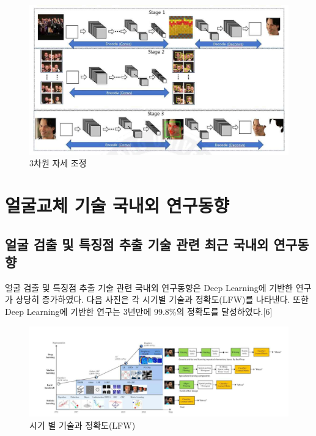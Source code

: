 \documentclass[chapter,oneside]{oblivoir}
\begin{document}
\begin{enumerate}
    \begin{figure}[h!]
        \centering
        \includegraphics{pic/chp1/img496}
        \caption{ 3차원 자세 조정\cite{reference4}}
    \end{figure}
\end{enumerate}

\section{얼굴교체 기술 국내외 연구동향}

\subsection{얼굴 검출 및 특징점 추출 기술 관련 최근 국내외 연구동향}

얼굴 검출 및 특징점 추출 기술 관련 국내외 연구동향은 Deep Learning에 기반한 연구가 상당히 증가하였다. 다음 사진은 각 시기별 기술과 정확도(LFW)를 나타낸다. 또한 Deep Learning에 기반한 연구는 3년만에 99.8\%의 정확도를 달성하였다.[6]


\begin{figure}[h!]
\centering
\includegraphics[scale = 0.7]{pic/chp1/img497}
\caption{ 시기 별 기술과 정확도(LFW) \cite{reference6}}
\end{figure}
\end{document}
